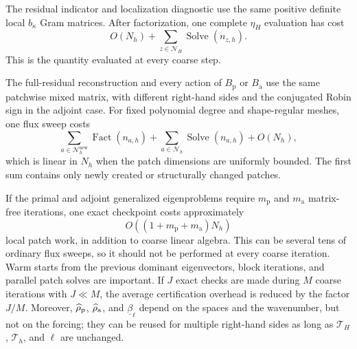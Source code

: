The residual indicator and localization diagnostic use the same positive
definite local $b_\kappa$ Gram matrices.  After factorization, one complete
$\eta_H$ evaluation has cost
\begin{equation}
\label{eq:etaH-cost}
  O(N_h)+\sum_{z\in\mathcal N_H}\operatorname{Solve}(n_{z,h}).
\end{equation}
This is the quantity evaluated at every coarse step.

The full-residual reconstruction and every action of $B_{\mathrm p}$ or
$B_{\mathrm a}$ use the same patchwise mixed matrix, with different
right-hand sides and the conjugated Robin sign in the adjoint case.  For
fixed polynomial degree and shape-regular meshes, one flux sweep costs
\begin{equation}
\label{eq:flux-sweep-cost}
  \sum_{a\in\mathcal N_h^{\mathrm{new}}}
      \operatorname{Fact}(n_{a,h})
  +\sum_{a\in\mathcal N_h}\operatorname{Solve}(n_{a,h})
  +O(N_h),
\end{equation}
which is linear in $N_h$ when the patch dimensions are uniformly bounded.
The first sum contains only newly created or structurally changed patches.

If the primal and adjoint generalized eigenproblems require
$m_{\mathrm p}$ and $m_{\mathrm a}$ matrix-free iterations, one exact
checkpoint costs approximately
\begin{equation}
\label{eq:checkpoint-cost}
  O\!\left((1+m_{\mathrm p}+m_{\mathrm a})N_h\right)
\end{equation}
local patch work, in addition to coarse linear algebra.  This can be
several tens of ordinary flux sweeps, so it should not be performed at
every coarse iteration.  Warm starts from the previous dominant
eigenvectors, block iterations, and parallel patch solves are important.
If $J$ exact checks are made during $M$ coarse iterations with $J\ll M$,
the average certification overhead is reduced by the factor $J/M$.
Moreover, $\widehat\rho_{\mathrm p}$, $\widehat\rho_{\mathrm a}$, and $\underline\beta_\ell$ depend on the
spaces and the wavenumber, but not on the forcing; they can be reused for
multiple right-hand sides as long as $\mathcal T_H$, $\mathcal T_h$, and
$\ell$ are unchanged.


